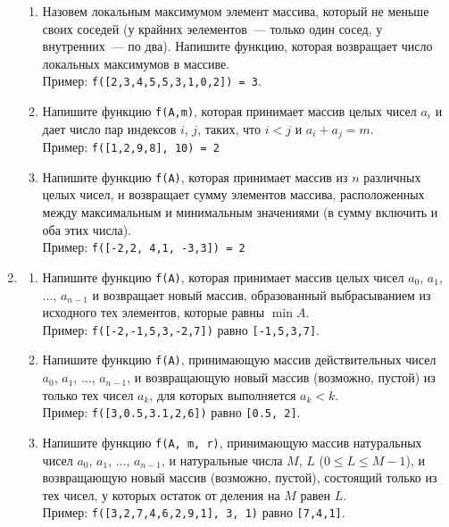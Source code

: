 \documentclass{article}
\begin{document}
\begin{enumerate}[label={}, leftmargin=0pt, itemindent=0pt]
\begin{enumerate}[label=\arabic{enumi}.\arabic*.]
\item 
Назовем локальным максимумом элемент массива, который не меньше своих соседей (у крайних эелементов~--- только один сосед, у внутренних~--- по два). Напишите функцию, которая возвращает число локальных максимумов в массиве.
\\Пример: \texttt{f([2,3,4,5,5,3,1,0,2]) = 3}.

\item Напишите функцию \texttt{f(A,m)}, которая принимает массив целых чисел $a_i$ и дает число пар индексов $i$, $j$, таких, что $i<j$ и $a_i + a_j=m$.
\\Пример: \texttt{f([1,2,9,8],\,10) = 2}

\item  
Напишите функцию \texttt{f(A)}, которая принимает массив из $n$ различных целых чисел, и возвращает сумму элементов массива, расположенных между максимальным и минимальным значениями (в сумму включить и оба этих числа).
\\Пример: \texttt{f([-2,2, 4,1, -3,3]) = 2}

\end{enumerate}

\hrulefill


\item
\begin{enumerate}[label=\arabic{enumi}.\arabic*.]
\item 
Напишите функцию \texttt{f(A)}, которая принимает массив целых чисел $a_0$, $a_1$, $\ldots$, $a_{n-1}$ и возвращает новый массив, образованный выбрасыванием из исходного тех элементов, которые равны $\min A$.
\\Пример: \texttt{f([-2,-1,5,3,-2,7])} равно \texttt{[-1,5,3,7]}.

\item 
Напишите функцию \texttt{f(A)}, принимающую массив действительных чисел $a_0$, $a_1$, $\ldots$, $a_{n-1}$, и возвращающую новый массив (возможно, пустой) из только тех чисел $a_k$, для которых выполняется $a_k<k$.
\\Пример: \texttt{f([3,0.5,3.1,2,6])} равно \texttt{[0.5,\,2]}.

\item 
Напишите функцию \texttt{f(A, m, r)}, принимающую массив натуральных чисел $a_0$, $a_1$, $\ldots$, $a_{n-1}$, и натуральные числа $M$, $L$ ($0 \le L \le M-1$), и возвращающую новый массив (возможно, пустой), состоящий только из тех чисел, у которых  остаток от деления на $M$ равен $L$.
\\Пример: \texttt{f([3,2,7,4,6,2,9,1],\,3,\,1)} равно \texttt{[7,4,1]}.


\end{enumerate}
\end{enumerate}
\end{document}
